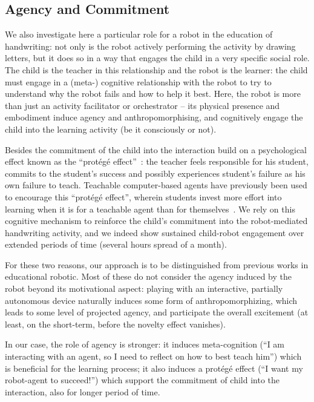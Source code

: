 \documentclass{article}
\begin{document}
\subsection{Agency and Commitment}

We also investigate here a particular role for a robot in the
education of handwriting: not only is the robot actively performing the activity
by drawing letters, but it does so in a way that engages the child in a very
specific social role. The child is the teacher in this relationship and the
robot is the learner: the child must engage in a (meta-) cognitive relationship
with the robot to try to understand why the robot fails and how to help it best.
Here, the robot is more than just an activity facilitator or orchestrator -- its
physical presence and embodiment induce agency and anthropomorphising, and
cognitively engage the child into the learning activity (be it consciously or
not).

Besides the commitment of the child into the interaction build on a
psychological effect known as the
``protégé effect''~\cite{Chase2009}: the teacher feels responsible for his student, commits
to the student's success and possibly experiences student's failure as his own
failure to teach. Teachable computer-based agents have previously been used to
encourage this ``protégé effect'', wherein students invest more effort into
learning when it is for a teachable agent than for themselves~\cite{Chase2009}.
We rely on this cognitive mechanism to reinforce the child's commitment into the
robot-mediated handwriting activity, and we indeed show sustained child-robot
engagement over extended periods of time (several hours spread of a month).

For these two reasons, our approach is to be distinguished from previous works in
educational robotic. Most of these do not consider the agency induced by the
robot beyond its motivational aspect: playing with an interactive, partially autonomous
device naturally induces some form of anthropomorphizing, which leads to some
level of projected agency, and participate the overall excitement (at least, on
the short-term, before the novelty effect vanishes).

In our case, the role of agency is stronger: it induces meta-cognition (``I am
interacting with an agent, so I need to reflect on how to best teach him'')
which is beneficial for the learning process; it also induces a protégé
effect (``I want my robot-agent to succeed!'') which support the commitment of
child into the interaction, also for longer period of time.
\end{document}
